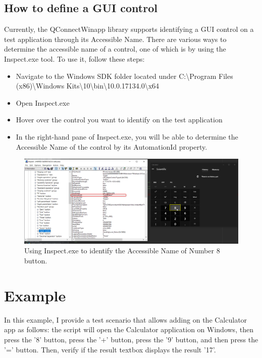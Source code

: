\hypertarget{definition}{%
\subsection{\texorpdfstring{\textbf{How to define a GUI control}}{definition}}\label{definition}}
Currently, the QConnectWinapp library supports identifying a GUI control on a test application through its Accessible Name. There are various ways to determine the accessible name of a control, one of which is by using the Inspect.exe tool. To use it, follow these steps:
\begin{itemize}
\item Navigate to the Windows SDK folder located under C:\textbackslash Program Files (x86)\textbackslash Windows Kits\textbackslash 10\textbackslash bin\textbackslash 10.0.17134.0\textbackslash x64
\item Open Inspect.exe
\item Hover over the control you want to identify on the test application
\item In the right-hand pane of Inspect.exe, you will be able to determine the Accessible Name of the control by its AutomationId property.
\end{itemize}

\begin{figure}[h]
  \centering
  \includegraphics[width=\linewidth]{pictures/capture_control.png}
  \caption{Using Inspect.exe to identify the Accessible Name of Number 8 button.}
\end{figure}

\hypertarget{example}{%
\section{Example}\label{example}}
In this example, I provide a test scenario that allows adding on the Calculator app as follows: the script will open the Calculator application on Windows, then press the '8' button, press the '+' button, press the '9' button, and then press the '=' button.
Then, verify if the result textbox displays the result '17'.


